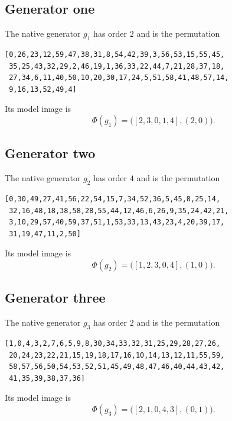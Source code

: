 \subsection{Generator one}

The native generator $g_1$ has order $2$ and is the permutation

\begin{small}
\begin{verbatim}
[0,26,23,12,59,47,38,31,8,54,42,39,3,56,53,15,55,45,
 35,25,43,32,29,2,46,19,1,36,33,22,44,7,21,28,37,18,
 27,34,6,11,40,50,10,20,30,17,24,5,51,58,41,48,57,14,
 9,16,13,52,49,4]
\end{verbatim}
\end{small}

Its model image is
\[
\Phi(g_1)
=
\bigl(
[2,3,0,1,4],
(2,0)
\bigr).
\]

\subsection{Generator two}

The native generator $g_2$ has order $4$ and is the permutation

\begin{small}
\begin{verbatim}
[0,30,49,27,41,56,22,54,15,7,34,52,36,5,45,8,25,14,
 32,16,48,18,38,58,28,55,44,12,46,6,26,9,35,24,42,21,
 3,10,29,57,40,59,37,51,1,53,33,13,43,23,4,20,39,17,
 31,19,47,11,2,50]
\end{verbatim}
\end{small}

Its model image is
\[
\Phi(g_2)
=
\bigl(
[1,2,3,0,4],
(1,0)
\bigr).
\]

\subsection{Generator three}

The native generator $g_3$ has order $2$ and is the permutation

\begin{small}
\begin{verbatim}
[1,0,4,3,2,7,6,5,9,8,30,34,33,32,31,25,29,28,27,26,
 20,24,23,22,21,15,19,18,17,16,10,14,13,12,11,55,59,
 58,57,56,50,54,53,52,51,45,49,48,47,46,40,44,43,42,
 41,35,39,38,37,36]
\end{verbatim}
\end{small}

Its model image is
\[
\Phi(g_3)
=
\bigl(
[2,1,0,4,3],
(0,1)
\bigr).
\]


